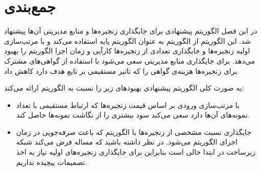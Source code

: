\section{جمع‌بندی}

در این فصل الگوریتم پیشنهادی برای جایگذاری زنجیره‌ها و منابع مدیریتی آن‌ها پیشنهاد شد.
این الگوریتم از الگوریتم \cite{Bari2015}
به عنوان الگوریتم پایه استفاده می‌کند و با مرتب‌سازی اولیه زنجیره‌ها
و جایگذاری 
تعدادی از زنجیره‌ها کارآیی و زمان اجرا الگوریتم را بهبود می‌دهد.
برای جایگذاری منابع مدیریتی سعی می‌شود با استفاده از گواهی‌های مشترک برای زنجیره‌ها
هزینه‌ی گواهی را که تاثیر مستقیمی بر تابع هدف دارد کاهش داد.

به صورت کلی الگوریتم پیشنهادی بهبودهای زیر را نسبت به الگوریتم \cite{Bari2015} ارائه می‌کند:

\begin{itemize}
  \item
  با مرتب‌سازی ورودی بر اساس قیمت زنجیره‌ها که ارتباط مستقیمی با تعداد نمونه‌های آن‌ها دارد
  سعی می‌کند سود بیشتری را از نگاشت نمونه‌ها حاصل کند.
  \item
  جایگذاری نسبت مشخصی از زنجیره‌ها با الگوریتم  که باعث صرفه‌جویی در زمان اجرای الگوریتم می‌شود.
  در نظر داشته باشید که مساله فرض می‌کند شبکه زیرساخت در ابتدا خالی است بنابراین برای جایگذاری زنجیره‌های اولیه نیاز به اخذ تصمیمات پیچیده نداریم.
\end{itemize}